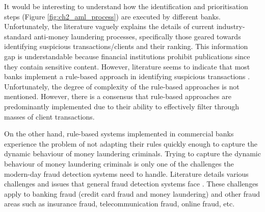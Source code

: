 It would be interesting to understand how the identification and prioritisation steps (Figure \ref{fig:ch2_aml_process}) are executed by different banks. Unfortunately, the literature vaguely explains the details of current industry-standard anti-money laundering processes, specifically those geared towards identifying suspicious transactions/clients and their ranking. This information gap is understandable because financial institutions prohibit publications since they contain sensitive content. However, literature seems to indicate that most banks implement a rule-based approach in identifying suspicious transactions \citep{abdallah2016fraud, chen2018machine, sudjianto2010statistical, gao2007framework}. Unfortunately, the degree of complexity of the rule-based approaches is not mentioned. However, there is a consensus that rule-based approaches are predominantly implemented due to their ability to effectively filter through masses of client transactions.   

On the other hand, rule-based systems implemented in commercial banks experience the problem of not adapting their rules quickly enough to capture the dynamic behaviour of money laundering criminals. Trying to capture the dynamic behaviour of money laundering criminals is only one of the challenges the modern-day fraud detection systems need to handle. Literature details various challenges and issues that general fraud detection systems face \citep{abdallah2016fraud, sudjianto2010statistical, gao2007framework, van2017gotcha} . These challenges apply to banking fraud (credit card fraud and money laundering) and other fraud areas such as insurance fraud, telecommunication fraud, online fraud, etc.    

